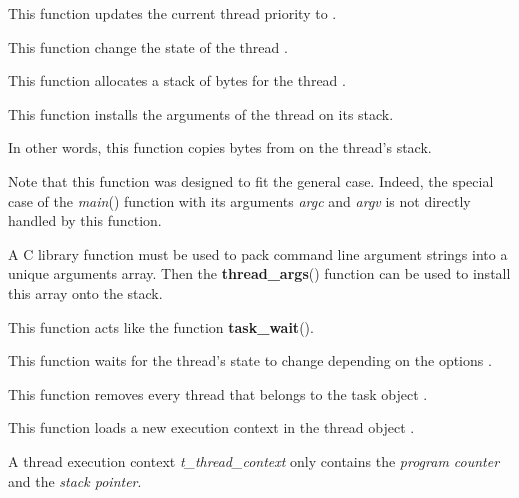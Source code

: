 	 {
	   This function updates the current thread priority
	   to .
	 }

	 {
	   This function change the state of the thread .
	 }

	 {
	   This function allocates a stack of  bytes
	   for the thread .
	 }

	 {
	   This function installs the arguments of the thread 
	   on its stack.

	   In other words, this function copies  bytes
	   from  on the thread's stack.

	   Note that this function was designed to fit the general case.
	   Indeed, the special case of the \textit{main}() function
	   with its arguments \textit{argc} and \textit{argv} is not
	   directly handled by this function.

	   A C library function must be used to pack command line
	   argument strings into a unique arguments array. Then the
	   \textbf{thread\_args}() function can be used to install
	   this array onto the stack.

	 }

	 {
	   This function acts like the function \textbf{task\_wait}().

	   This function waits for the thread's state to change depending on
	   the options .
	 }

	 {
	   This function removes every thread that belongs to the
	   task object .
	 }

	 {
	   This function loads a new execution context in the thread
	   object .

	   A thread execution context \textit{t\_thread\_context}
	   only contains the \textit{program counter} and the
	   \textit{stack pointer}.
	 }

